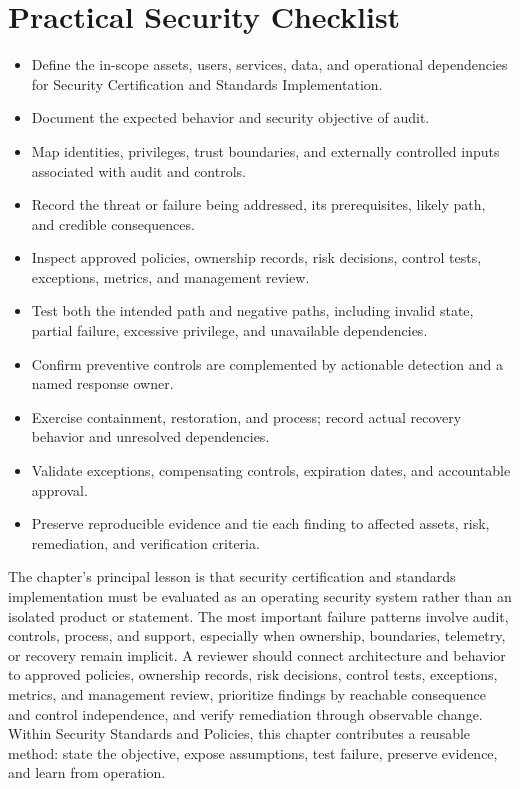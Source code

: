 \documentclass[11pt]{article}
\begin{document}
\section*{Practical Security Checklist}
\begin{itemize}[label=$\square$]
\item Define the in-scope assets, users, services, data, and operational dependencies for Security Certification and Standards Implementation.
\item Document the expected behavior and security objective of audit.
\item Map identities, privileges, trust boundaries, and externally controlled inputs associated with audit and controls.
\item Record the threat or failure being addressed, its prerequisites, likely path, and credible consequences.
\item Inspect approved policies, ownership records, risk decisions, control tests, exceptions, metrics, and management review.
\item Test both the intended path and negative paths, including invalid state, partial failure, excessive privilege, and unavailable dependencies.
\item Confirm preventive controls are complemented by actionable detection and a named response owner.
\item Exercise containment, restoration, and process; record actual recovery behavior and unresolved dependencies.
\item Validate exceptions, compensating controls, expiration dates, and accountable approval.
\item Preserve reproducible evidence and tie each finding to affected assets, risk, remediation, and verification criteria.
\end{itemize}
\begin{synthesisbox}
The chapter's principal lesson is that security certification and standards implementation must be evaluated as an operating security system rather than an isolated product or statement. The most important failure patterns involve audit, controls, process, and support, especially when ownership, boundaries, telemetry, or recovery remain implicit. A reviewer should connect architecture and behavior to approved policies, ownership records, risk decisions, control tests, exceptions, metrics, and management review, prioritize findings by reachable consequence and control independence, and verify remediation through observable change. Within Security Standards and Policies, this chapter contributes a reusable method: state the objective, expose assumptions, test failure, preserve evidence, and learn from operation.
\end{synthesisbox}
\end{document}
